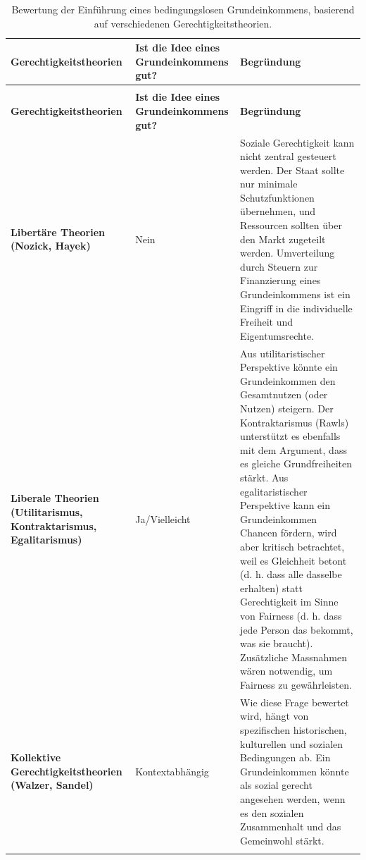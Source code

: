 \documentclass[
  nswissgerman,
  a4paper,
  openany]{book}
\begin{document}
\begin{longtable}[t]{>{\raggedright\arraybackslash}p{3.2cm}>{\raggedright\arraybackslash}p{2.5cm}>{\raggedright\arraybackslash}p{9.3cm}}

\caption{\label{tbl-basic-income-justice}Bewertung der Einführung eines
bedingungslosen Grundeinkommens, basierend auf verschiedenen
Gerechtigkeitstheorien.}

\tabularnewline

\toprule
\textbf{Gerechtigkeitstheorien} & \textbf{Ist die Idee eines Grundeinkommens gut?} & \textbf{Begründung}\\
\midrule
\endfirsthead
\multicolumn{3}{@{}l}{\textit{(continued)}}\\
\toprule
\textbf{Gerechtigkeitstheorien} & \textbf{Ist die Idee eines Grundeinkommens gut?} & \textbf{Begründung}\\
\midrule
\endhead

\endfoot
\bottomrule
\endlastfoot
\textbf{Libertäre Theorien (Nozick, Hayek)} & Nein & Soziale Gerechtigkeit kann nicht zentral gesteuert werden. Der Staat sollte nur minimale Schutzfunktionen übernehmen, und Ressourcen sollten über den Markt zugeteilt werden. Umverteilung durch Steuern zur Finanzierung eines Grundeinkommens ist ein Eingriff in die individuelle Freiheit und Eigentumsrechte.\\
\textbf{Liberale Theorien (Utilitarismus, Kontraktarismus, Egalitarismus)} & Ja/Vielleicht & Aus utilitaristischer Perspektive könnte ein Grundeinkommen den Gesamtnutzen (oder Nutzen) steigern. Der Kontraktarismus (Rawls) unterstützt es ebenfalls mit dem Argument, dass es gleiche Grundfreiheiten stärkt. Aus egalitaristischer Perspektive kann ein Grundeinkommen Chancen fördern, wird aber kritisch betrachtet, weil es Gleichheit betont (d. h. dass alle dasselbe erhalten) statt Gerechtigkeit im Sinne von Fairness (d. h. dass jede Person das bekommt, was sie braucht). Zusätzliche Massnahmen wären notwendig, um Fairness zu gewährleisten.\\
\textbf{Kollektive Gerechtigkeitstheorien (Walzer, Sandel)} & Kontextabhängig & Wie diese Frage bewertet wird, hängt von spezifischen historischen, kulturellen und sozialen Bedingungen ab. Ein Grundeinkommen könnte als sozial gerecht angesehen werden, wenn es den sozialen Zusammenhalt und das Gemeinwohl stärkt.\\*

\end{longtable}

\endgroup{}
\end{document}
